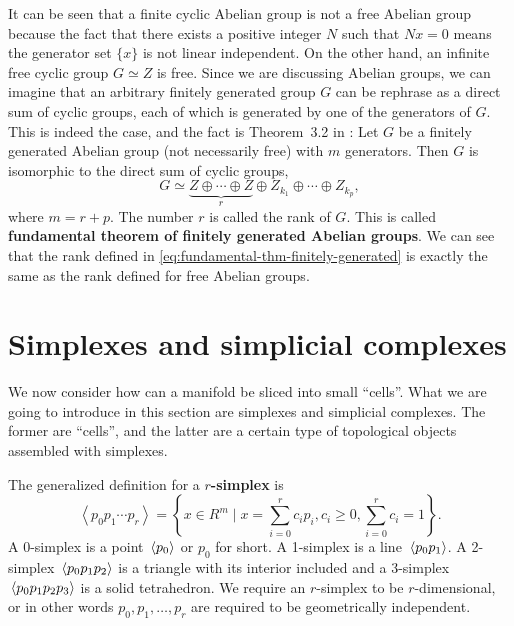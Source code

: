 \documentclass[hyperref, a4paper]{article}
\newcommand*{\concept}[1]{{\textbf{#1}}}
\def\mathbb#1{#1}%
\begin{document}
It can be seen that a finite cyclic Abelian group is not a free Abelian group because the fact that there exists a positive 
integer $N$ such that $Nx = 0$ means the generator set $\{x\}$ is not linear independent.
On the other hand, an infinite free cyclic group $G \simeq \mathbb{Z}$ is free.
Since we are discussing Abelian groups, we can imagine that an arbitrary finitely generated group $G$ can be 
rephrase as a direct sum of cyclic groups, each of which is generated by one of the generators of $G$.
This is indeed the case, and the fact is Theorem~3.2 in \cite{nakahara}: 
Let $G$ be a finitely generated Abelian group (not necessarily free) with $m$ generators. 
Then $G$ is isomorphic to the direct sum of cyclic groups,
\begin{equation}
    G \simeq \underbrace{\mathbb{Z} \oplus \cdots \oplus \mathbb{Z}}_{r} \oplus \mathbb{Z}_{k_{1}} \oplus \cdots \oplus \mathbb{Z}_{k_{p}},
    \label{eq:fundamental-thm-finitely-generated}
\end{equation}
where $m=r+p$. The number $r$ is called the rank of $G$.
This is called \concept{fundamental theorem of finitely generated Abelian groups}.
We can see that the rank defined in \eqref{eq:fundamental-thm-finitely-generated} is exactly the same as the rank defined for 
free Abelian groups.

\section{Simplexes and simplicial complexes}

We now consider how can a manifold be sliced into small ``cells''. What we are going to introduce in this section 
are simplexes and simplicial complexes. The former are ``cells'', and the latter are a certain type of topological 
objects assembled with simplexes. 

The generalized definition for a \concept{$r$-simplex} is 
\begin{equation}
    \left\langle p_{0} p_{1} \cdots p_{r}\right\rangle=\left\{x \in \mathbb{R}^{m} \mid x=\sum_{i=0}^{r} c_{i} p_{i}, c_{i} \geq 0, \sum_{i=0}^{r} c_{i}=1\right\}.
\end{equation}
A 0-simplex is a point $\expval*{p_0}$ or $p_0$ for short. A 1-simplex is a line $\expval*{p_0 p_1}$. 
A 2-simplex $\expval*{p_0 p_1 p_2}$ is a triangle with its interior included 
and a 3-simplex $\expval*{p_0 p_1 p_2 p_3}$ is a solid tetrahedron.
We require an $r$-simplex to be $r$-dimensional, or in other words $p_0, p_1, \ldots, p_r$ are required 
to be geometrically independent.
\end{document}
